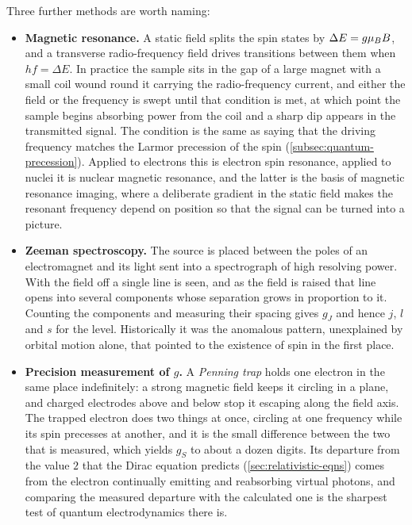         Three further methods are worth naming:

        \begin{itemize}
            \item \textbf{Magnetic resonance.} A static field splits the spin states by $\Delta E = g\mu_{B} B$, and a transverse radio-frequency field drives transitions between them when $hf = \Delta E$. In practice the sample sits in the gap of a large magnet with a small coil wound round it carrying the radio-frequency current, and either the field or the frequency is swept until that condition is met, at which point the sample begins absorbing power from the coil and a sharp dip appears in the transmitted signal. The condition is the same as saying that the driving frequency matches the Larmor precession of the spin (\cref{subsec:quantum-precession}). Applied to electrons this is electron spin resonance, applied to nuclei it is nuclear magnetic resonance, and the latter is the basis of magnetic resonance imaging, where a deliberate gradient in the static field makes the resonant frequency depend on position so that the signal can be turned into a picture.
            \item \textbf{Zeeman spectroscopy.} The source is placed between the poles of an electromagnet and its light sent into a spectrograph of high resolving power. With the field off a single line is seen, and as the field is raised that line opens into several components whose separation grows in proportion to it. Counting the components and measuring their spacing gives $g_J$ and hence $j$, $l$ and $s$ for the level. Historically it was the anomalous pattern, unexplained by orbital motion alone, that pointed to the existence of spin in the first place.
            \item \textbf{Precision measurement of $g$.} A \emph{Penning trap} holds one electron in the same place indefinitely: a strong magnetic field keeps it circling in a plane, and charged electrodes above and below stop it escaping along the field axis. The trapped electron does two things at once, circling at one frequency while its spin precesses at another, and it is the small difference between the two that is measured, which yields $g_{S}$ to about a dozen digits. Its departure from the value $2$ that the Dirac equation predicts (\cref{sec:relativistic-eqns}) comes from the electron continually emitting and reabsorbing virtual photons, and comparing the measured departure with the calculated one is the sharpest test of quantum electrodynamics there is.
        \end{itemize}

